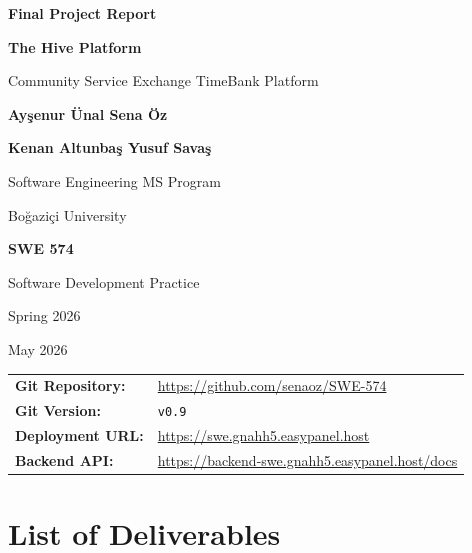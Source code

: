 \documentclass[11pt,a4paper]{report}
\begin{document}
\begin{titlepage}
    \centering
    \vspace*{2cm}
    {\Huge\textbf{Final Project Report}\par}
    \vspace{1cm}
    {\Large\textbf{The Hive Platform}\par}
    {\large Community Service Exchange TimeBank Platform\par}
    \vspace{2cm}
    {\Large\textbf{Ay\c{s}enur \"{U}nal \quad Sena \"{O}z}\par}
    {\Large\textbf{Kenan Altunba\c{s} \quad Yusuf Sava\c{s}}\par}
    \vspace{1cm}
    {\large Software Engineering MS Program\par}
    {Bo\u{g}azi\c{c}i University\par}
    \vspace{1cm}
    {\large\textbf{SWE 574}\par}
    {Software Development Practice\par}
    {Spring 2026\par}
    \vspace{1cm}
    {May 2026\par}
    \vspace{2cm}
    \begin{tabularx}{\textwidth}{XX}
        \textbf{Git Repository:} & \url{https://github.com/senaoz/SWE-574}              \\
        \textbf{Git Version:}    & \texttt{v0.9}                                        \\
        \textbf{Deployment URL:} & \url{https://swe.gnahh5.easypanel.host}              \\
        \textbf{Backend API:}    & \url{https://backend-swe.gnahh5.easypanel.host/docs} \\
    \end{tabularx}
\end{titlepage}
\thispagestyle{empty}

\newpage
\tableofcontents
\newpage
\listoffigures
\newpage
\listoftables

\chapter{List of Deliverables}
\end{document}

